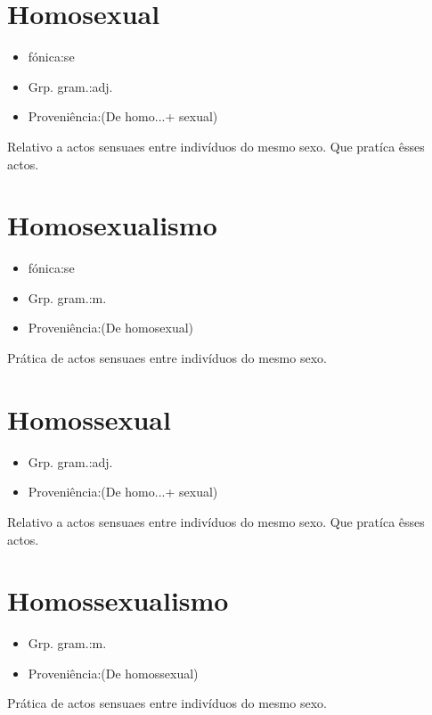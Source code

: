 \documentclass{article}
\begin{document}
\section{Homosexual}
\begin{itemize}
\item {fónica:se}
\end{itemize}
\begin{itemize}
\item {Grp. gram.:adj.}
\end{itemize}
\begin{itemize}
\item {Proveniência:(De \textunderscore homo...\textunderscore  + \textunderscore sexual\textunderscore )}
\end{itemize}
Relativo a actos sensuaes entre indivíduos do mesmo sexo.
Que pratíca êsses actos.
\section{Homosexualismo}
\begin{itemize}
\item {fónica:se}
\end{itemize}
\begin{itemize}
\item {Grp. gram.:m.}
\end{itemize}
\begin{itemize}
\item {Proveniência:(De \textunderscore homosexual\textunderscore )}
\end{itemize}
Prática de actos sensuaes entre indivíduos do mesmo sexo.
\section{Homossexual}
\begin{itemize}
\item {Grp. gram.:adj.}
\end{itemize}
\begin{itemize}
\item {Proveniência:(De \textunderscore homo...\textunderscore  + \textunderscore sexual\textunderscore )}
\end{itemize}
Relativo a actos sensuaes entre indivíduos do mesmo sexo.
Que pratíca êsses actos.
\section{Homossexualismo}
\begin{itemize}
\item {Grp. gram.:m.}
\end{itemize}
\begin{itemize}
\item {Proveniência:(De \textunderscore homossexual\textunderscore )}
\end{itemize}
Prática de actos sensuaes entre indivíduos do mesmo sexo.
\end{document}
